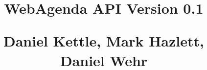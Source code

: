 \documentclass[letterpaper,12pt]{report}
\begin{document}
{
  \centering
    \title{WebAgenda API Version 0.1 \linebreak
	    \begin{small} \linebreak
		Daniel Kettle, Mark Hazlett, Daniel Wehr 
	    \end{small}}

    \author{}

    \maketitle
}


\end{document}
